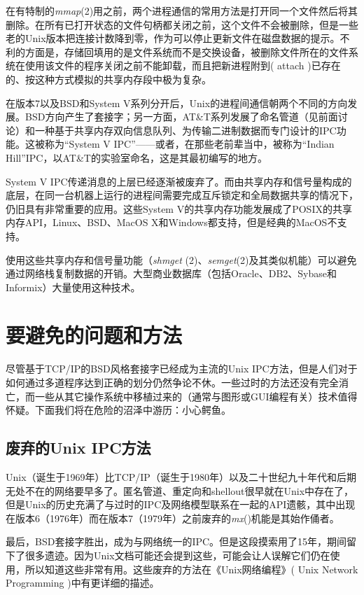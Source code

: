 \documentclass[12pt,oneside]{book}
\begin{document}
\begin{common-format}
在有特制的\textit{mmap}(2)用之前，两个进程通信的常用方法是打开同一个文件然后将其删除。在所有已打开状态的文件句柄都关闭之前，这个文件不会被删除，但是一些老的Unix版本把连接计数降到零，作为可以停止更新文件在磁盘数据的提示。不利的方面是，存储回填用的是文件系统而不是交换设备，被删除文件所在的文件系统在使用该文件的程序关闭之前不能卸载，而且把新进程附到( attach )已存在的、按这种方式模拟的共享内存段中极为复杂。

在版本7以及BSD和System V系列分开后，Unix的进程间通信朝两个不同的方向发展。BSD方向产生了套接字；另一方面，AT\&{}T系列发展了命名管道（见前面讨论）和一种基于共享内存双向信息队列、为传输二进制数据而专门设计的IPC功能。这被称为“System V IPC”——或者，在那些老前辈当中，被称为“Indian Hill”IPC，以AT\&{}T的实验室命名，这是其最初编写的地方。

System V IPC传递消息的上层已经逐渐被废弃了。而由共享内存和信号量构成的底层，在同一台机器上运行的进程间需要完成互斥锁定和全局数据共享的情况下，仍旧具有非常重要的应用。这些System V的共享内存功能发展成了POSIX的共享内存API，Linux、BSD、MacOS X和Windows都支持，但是经典的MacOS不支持。

使用这些共享内存和信号量功能（\textit{shmget }(2)、\textit{semget}(2)及其类似机能）可以避免通过网络栈复制数据的开销。大型商业数据库（包括Oracle、DB2、Sybase和Informix）大量使用这种技术。



\section{要避免的问题和方法}
尽管基于TCP/IP的BSD风格套接字已经成为主流的Unix IPC方法，但是人们对于如何通过多道程序达到正确的划分仍然争论不休。一些过时的方法还没有完全消亡，而一些从其它操作系统中移植过来的（通常与图形或GUI编程有关）技术值得怀疑。下面我们将在危险的沼泽中游历：小心鳄鱼。


\subsection{废弃的Unix IPC方法}
Unix（诞生于1969年）比TCP/IP（诞生于1980年）以及二十世纪九十年代和后期无处不在的网络要早多了。匿名管道、重定向和shellout很早就在Unix中存在了，但是Unix的历史充满了与过时的IPC及网络模型联系在一起的API遗骸，其中出现在版本6（1976年）而在版本7（1979年）之前废弃的\textit{mx}()机能是其始作俑者。

最后，BSD套接字胜出，成为与网络统一的IPC。但是这段摸索用了15年，期间留下了很多遗迹。因为Unix文档可能还会提到这些，可能会让人误解它们仍在使用，所以知道这些非常有用。这些废弃的方法在《Unix网络编程》( Unix Network Programming )\cite{Stevens90}中有更详细的描述。


\end{common-format}
\end{document}
